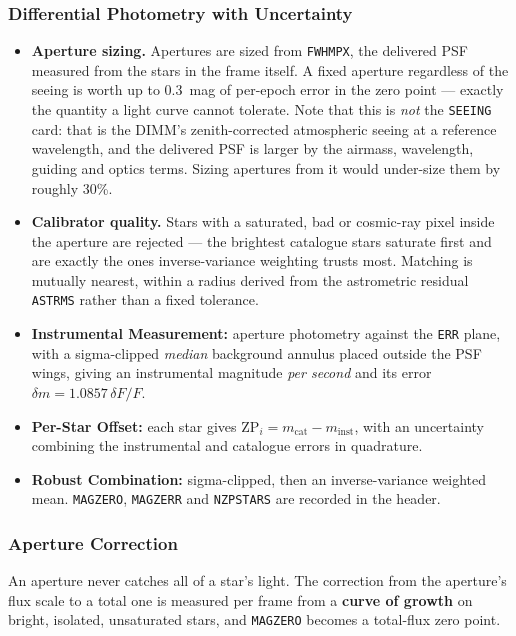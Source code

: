 \documentclass[11pt,a4paper]{article}
\begin{document}
\subsubsection{Differential Photometry with Uncertainty}
\begin{itemize}[leftmargin=*]
    \item \textbf{Aperture sizing.} Apertures are sized from \texttt{FWHMPX},
    the delivered PSF measured from the stars in the frame itself. A fixed
    aperture regardless of the seeing is worth up to 0.3~mag of per-epoch error
    in the zero point --- exactly the quantity a light curve cannot tolerate.
    Note that this is \emph{not} the \texttt{SEEING} card: that is the DIMM's
    zenith-corrected atmospheric seeing at a reference wavelength, and the
    delivered PSF is larger by the airmass, wavelength, guiding and optics
    terms. Sizing apertures from it would under-size them by roughly 30\%.
    \item \textbf{Calibrator quality.} Stars with a saturated, bad or
    cosmic-ray pixel inside the aperture are rejected --- the brightest
    catalogue stars saturate first and are exactly the ones inverse-variance
    weighting trusts most. Matching is mutually nearest, within a radius derived
    from the astrometric residual \texttt{ASTRMS} rather than a fixed tolerance.
    \item \textbf{Instrumental Measurement:} aperture photometry against the
    \texttt{ERR} plane, with a sigma-clipped \emph{median} background annulus
    placed outside the PSF wings, giving an instrumental magnitude
    \emph{per second} and its error $\delta m = 1.0857\,\delta F / F$.
    \item \textbf{Per-Star Offset:} each star gives
    $\mathrm{ZP}_i = m_{\mathrm{cat}} - m_{\mathrm{inst}}$, with an uncertainty
    combining the instrumental and catalogue errors in quadrature.
    \item \textbf{Robust Combination:} sigma-clipped, then an inverse-variance
    weighted mean. \texttt{MAGZERO}, \texttt{MAGZERR} and \texttt{NZPSTARS} are
    recorded in the header.
\end{itemize}

\subsubsection{Aperture Correction}
An aperture never catches all of a star's light. The correction from the
aperture's flux scale to a total one is measured per frame from a
\textbf{curve of growth} on bright, isolated, unsaturated stars, and
\texttt{MAGZERO} becomes a total-flux zero point.
\end{document}
